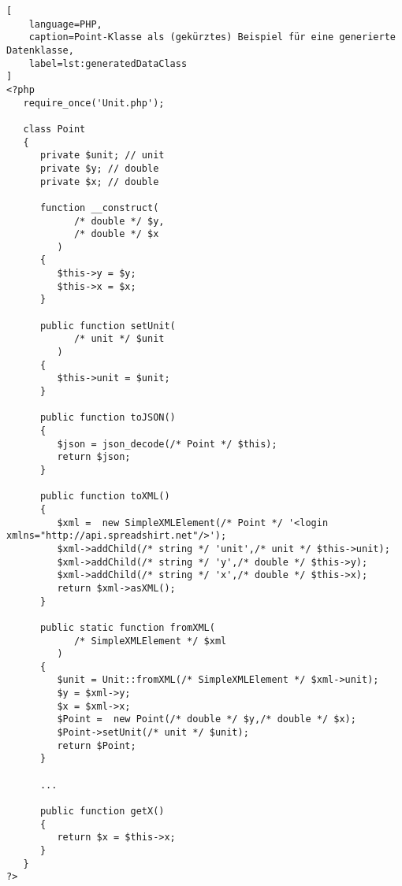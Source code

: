 \begin{lstlisting}[
    language=PHP,
    caption=Point-Klasse als (gekürztes) Beispiel für eine generierte Datenklasse,
    label=lst:generatedDataClass
]
<?php
   require_once('Unit.php');

   class Point
   {
      private $unit; // unit 
      private $y; // double 
      private $x; // double 

      function __construct(
            /* double */ $y,
            /* double */ $x
         )
      {
         $this->y = $y;
         $this->x = $x;
      }

      public function setUnit(
            /* unit */ $unit
         )
      {
         $this->unit = $unit;
      }

      public function toJSON()
      {
         $json = json_decode(/* Point */ $this);
         return $json;
      }

      public function toXML()
      {
         $xml =  new SimpleXMLElement(/* Point */ '<login xmlns="http://api.spreadshirt.net"/>');
         $xml->addChild(/* string */ 'unit',/* unit */ $this->unit);
         $xml->addChild(/* string */ 'y',/* double */ $this->y);
         $xml->addChild(/* string */ 'x',/* double */ $this->x);
         return $xml->asXML();
      }

      public static function fromXML(
            /* SimpleXMLElement */ $xml
         )
      {
         $unit = Unit::fromXML(/* SimpleXMLElement */ $xml->unit);
         $y = $xml->y;
         $x = $xml->x;
         $Point =  new Point(/* double */ $y,/* double */ $x);
         $Point->setUnit(/* unit */ $unit);
         return $Point;
      }

      ...

      public function getX()
      {
         return $x = $this->x;
      }
   }
?>
\end{lstlisting}

\newpage

